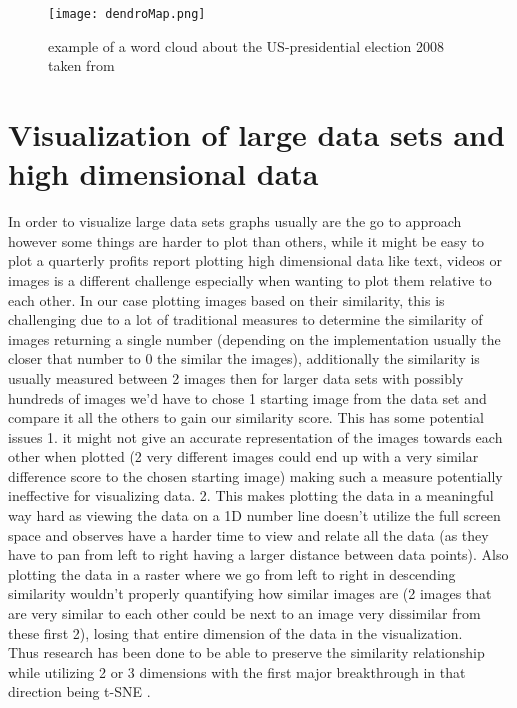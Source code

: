 \documentclass[
  a4paper,  %
  twoside,  %
  bibliography=totoc,
  headsepline,
  cleardoublepage=empty,
  parskip=half,
  draft=false
]{scrbook}
\begin{document}
  \begin{figure}[H]
	\centering
	\texttt{[image: dendroMap.png]}
	\caption{example of a word cloud about the US-presidential election 2008  taken from \cite{wordclouds}}
	\label{fig:dendroMap}
\end{figure}




\section{Visualization of large data sets and high dimensional data}
In order to visualize large data sets graphs usually are the go to approach however some things are harder to plot than others, while it might be easy to plot a quarterly profits report plotting high dimensional data like text, videos or images is a different challenge especially when wanting to plot them relative to each other. In our case plotting images based on their similarity, this is challenging due to a lot of traditional measures to determine the similarity of images returning a single number (depending on the implementation usually the closer that number to 0 the similar the images), additionally the similarity is usually measured between 2 images then for larger data sets with possibly hundreds of images we'd have to chose 1 starting image from the data set and compare it all the others to gain our similarity score. This has some potential issues 1. it might not give an accurate representation of the images towards each other when plotted (2 very different images could end up with a very similar difference score to the chosen starting image) making such a measure potentially ineffective for visualizing data. 2. This makes plotting the data in a meaningful way hard as viewing the data on a 1D number line doesn't utilize the full screen space and observes have a harder time to view and relate all the data (as they have to pan from left to right having a larger distance between data points). Also plotting the data in a raster where we go from left to right in descending similarity wouldn't properly quantifying how similar images are  (2 images that are very similar to each other could be next to an image very dissimilar from these first 2), losing that entire dimension of the data in the visualization. \\
Thus research has been done to be able to preserve the similarity relationship while utilizing 2 or 3 dimensions with the first major breakthrough in that direction being t-SNE \cite{van2008visualizing}.
\end{document}
